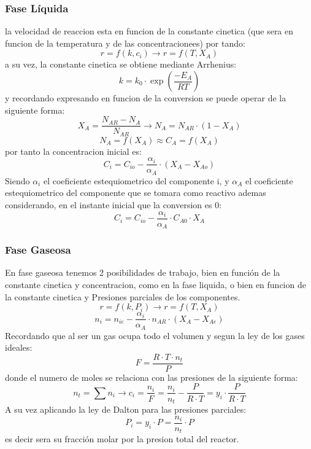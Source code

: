 \documentclass{report}
\begin{document}
\subsubsection{Fase Líquida}
la velocidad de reaccion esta en funcion de la constante cinetica (que sera en funcion de la temperatura y de las concentracionees) por tando:
\begin{equation}
	r = f(k,c_i) \rightarrow r=f(T,X_A)
\end{equation}
a su vez, la constante cinetica se obtiene mediante Arrhenius:
\begin{equation}
	k = k_0 \cdot \exp\left(\frac{-E_A}{RT}\right)
\end{equation}
y recordando expresando en funcion de la conversion se puede operar de la siguiente forma:
\begin{equation}
	X_A = \frac{N_{AR}-N_A}{N_{AR}} \rightarrow N_A = N_{AR} \cdot (1-X_A)
\end{equation}
\begin{equation*}
	N_A = f(X_A) \approx C_A = f(X_A)
\end{equation*}
por tanto la concentracion inicial es:
\begin{equation}
	C_{i} = C_{io} - \frac{\alpha_i}{\alpha_A} \cdot (X_A-X_{Ao})
\end{equation}
Siendo $\alpha_i$ el coeficiente estequiometrico del componente i, y $\alpha_A$ el coeficiente estequiometrico del componente que se tomara como reactivo  ademas considerando, en el instante inicial que la conversion es 0:
\begin{equation}
	C_{i} = C_{io} - \frac{\alpha_i}{\alpha_A} \cdot C_{A0} \cdot X_A
\end{equation}
\newpage
\subsubsection{Fase Gaseosa}
En fase gaseosa tenemos 2 posibilidades de trabajo, bien en función de la constante cinetica y concentracion, como en la fase liquida, o bien en funcion de la constante cinetica y Presiones parciales de los componentes.
\begin{equation*}
	r = f(k,P_i) \rightarrow r=f(T,X_A)
\end{equation*}
\begin{equation*}
	n_i = n_{ie} - \frac{\alpha_i}{\alpha_A} \cdot n_{AR} \cdot (X_A-X_{Ae})
\end{equation*}
Recordando que al ser un gas ocupa todo el volumen y segun la ley de los gases ideales:
\begin{equation}
	F = \frac{R \cdot T \cdot n_t}{P}
\end{equation}
donde el numero de moles se relaciona con las presiones de la siguiente forma:
\begin{equation}
	n_t = \sum n_i \rightarrow c_i = \frac{n_i}{F} = \frac{n_i}{n_t}-\frac{P}{R \cdot T} = y_i \cdot \frac{P}{R \cdot T}
\end{equation}
A su vez aplicando la ley de Dalton para las presiones parciales:
\begin{equation}
	P_i = y_i \cdot P = \frac{n_i}{n_t} \cdot P
\end{equation}
es decir sera su fracción molar por la presion total del reactor.
\end{document}
